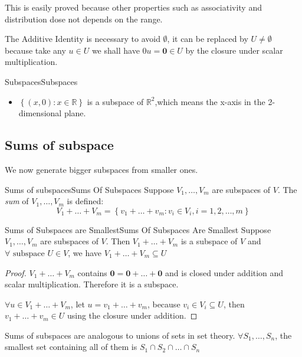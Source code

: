 \documentclass[../main.tex]{subfiles}
\begin{document}
This is easily proved because other properties such as associativity and distribution dose not depends on the range. 
\begin{remark}
The Additive Identity is necessary to avoid $\emptyset $, it can be replaced by $U\neq \emptyset $ because take any $u \in U$ we shall have $0u=\boldsymbol{0}\in U$ by the closure under scalar multiplication.
\end{remark}

\begin{example}{Subspaces}{Subspaces}
\begin{itemize}
\item $\left\{ (x,0):x \in \mathbb{R} \right\}$ is a subspace of $\mathbb{R}^2$,which means the x-axis in the 2-dimensional plane. 
\end{itemize}
\end{example}

\subsection{Sums of subspace}
We now generate bigger subspaces from smaller ones.
\begin{definition}{Sums of subspaces}{Sums Of Subspaces}
Suppose $V_1, \ldots ,V_m$ are subspaces of $V$. The \emph{sum} of $V_1, \ldots ,V_m$ is defined:
\begin{equation}
V_1+\ldots +V_m = \left\{ v_1+\ldots +v_m : v_i \in V_i,i=1,2, \ldots ,m \right\}
\end{equation}
\end{definition}

\begin{theorem}{Sums of Subspaces are Smallest}{Sums Of Subspaces Are Smallest}
	Suppose $V_1, \ldots ,V_m$ are subspaces of $V$. Then $V_1+\ldots +V_m$ is a subspace of $V$ and $\forall \text{ subspace } U \in V$, we have $V_1+\ldots +V_m \subseteq U$
\end{theorem}
\begin{proof}
$V_1+\ldots +V_m$ contains $\boldsymbol{0} = \boldsymbol{0}+\ldots +\boldsymbol{0}$ and is closed under addition and scalar multiplication. Therefore it is a subspace.

$\forall u \in V_1+\ldots +V_m$, let $u=v_1+\ldots +v_m$, because $v_i \in V_i \subseteq U$, then $v_1+\ldots +v_m \in U$ using the closure under addition.
\end{proof}
\begin{remark}
Sums of subspaces are analogous to unions of sets in set theory. $\forall S_1, \ldots ,S_n$, the smallest set containing all of them is $S_1\cap S_2\cap \ldots \cap S_n$
\end{remark}
\end{document}
